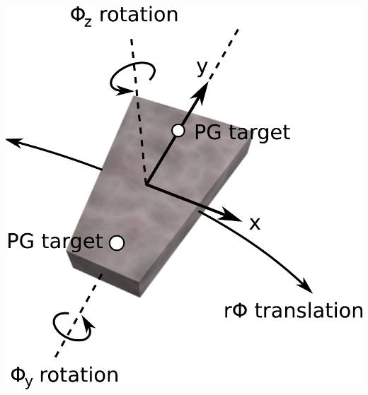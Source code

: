 \documentclass[compress]{beamer}
\begin{document}
\begin{frame}
\begin{columns}
\includegraphics[width=\linewidth]{csc_coordinates.pdf}
\end{columns}
\end{frame}
\end{document}
